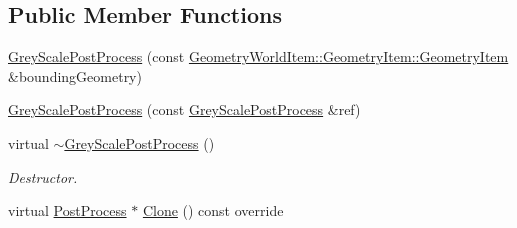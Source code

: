 \subsection*{Public Member Functions}
\begin{DoxyCompactItemize}
\item 
\mbox{\hyperlink{class_geometry_engine_1_1_geometry_post_process_1_1_single_pass_post_process_1_1_grey_scale_post_process_a35ec195850992180bbf781faad7e4028}{Grey\+Scale\+Post\+Process}} (const \mbox{\hyperlink{class_geometry_engine_1_1_geometry_world_item_1_1_geometry_item_1_1_geometry_item}{Geometry\+World\+Item\+::\+Geometry\+Item\+::\+Geometry\+Item}} \&bounding\+Geometry)
\item 
\mbox{\hyperlink{class_geometry_engine_1_1_geometry_post_process_1_1_single_pass_post_process_1_1_grey_scale_post_process_a3afc3201292b7456476355c821584c6a}{Grey\+Scale\+Post\+Process}} (const \mbox{\hyperlink{class_geometry_engine_1_1_geometry_post_process_1_1_single_pass_post_process_1_1_grey_scale_post_process}{Grey\+Scale\+Post\+Process}} \&ref)
\item 
\mbox{\label{class_geometry_engine_1_1_geometry_post_process_1_1_single_pass_post_process_1_1_grey_scale_post_process_ac8bd8d19e6dfb8407d64a3d62c1fa3a7}} 
virtual \mbox{\hyperlink{class_geometry_engine_1_1_geometry_post_process_1_1_single_pass_post_process_1_1_grey_scale_post_process_ac8bd8d19e6dfb8407d64a3d62c1fa3a7}{$\sim$\+Grey\+Scale\+Post\+Process}} ()
\begin{DoxyCompactList}\small\item\em Destructor. \end{DoxyCompactList}\item 
virtual \mbox{\hyperlink{class_geometry_engine_1_1_geometry_post_process_1_1_post_process}{Post\+Process}} $\ast$ \mbox{\hyperlink{class_geometry_engine_1_1_geometry_post_process_1_1_single_pass_post_process_1_1_grey_scale_post_process_a36f198711874587c9cbf5c958e6d09ea}{Clone}} () const override
\end{DoxyCompactItemize}
